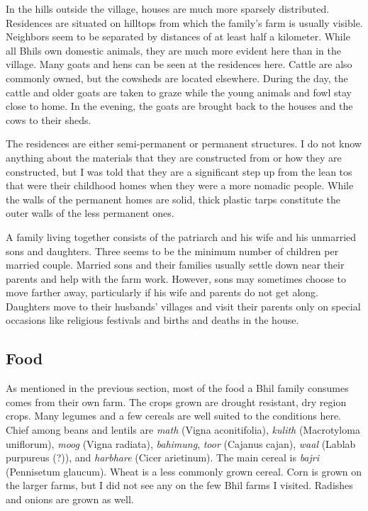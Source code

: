 \documentclass[report.tex]{subfiles}
\begin{document}
In the hills outside the village, houses are much more sparsely distributed. Residences are situated on hilltops from which the family's farm is usually visible. Neighbors seem to be separated by distances of at least half a kilometer. While all Bhils own domestic animals, they are much more evident here than in the village. Many goats and hens can be seen at the residences here. Cattle are also commonly owned, but the cowsheds are located elsewhere. During the day, the cattle and older goats are taken to graze while the young animals and fowl stay close to home. In the evening, the goats are brought back to the houses and the cows to their sheds.

The residences are either semi-permanent or permanent structures. I do not know anything about the materials that they are constructed from or how they are constructed, but I was told that they are a significant step up from the lean tos that were their childhood homes when they were a more nomadic people. While the walls of the permanent homes are solid, thick plastic tarps constitute the outer walls of the less permanent ones.

A family living together consists of the patriarch and his wife and his unmarried sons and daughters. Three seems to be the minimum number of children per married couple. Married sons and their families usually settle down near their parents and help with the farm work. However, sons may sometimes choose to move farther away, particularly if his wife and parents do not get along. Daughters move to their husbands' villages and visit their parents only on special occasions like religious festivals and births and deaths in the house.

\subsection{Food}\label{subsec:food}

As mentioned in the previous section, most of the food a Bhil family consumes comes from their own farm. The crops grown are drought resistant, dry region crops. Many legumes and a few cereals are well suited to the conditions here. Chief among beans and lentils are \textit{math} (Vigna aconitifolia), \textit{kulith} (Macrotyloma uniflorum), \textit{moog} (Vigna radiata), \textit{bahimung}, \textit{toor} (Cajanus cajan), \textit{waal} (Lablab purpureus (?)), and \textit{harbhare} (Cicer arietinum). The main cereal is \textit{bajri} (Pennisetum glaucum). Wheat is a less commonly grown cereal. Corn is grown on the larger farms, but I did not see any on the few Bhil farms I visited. Radishes and onions are grown as well.
\end{document}
